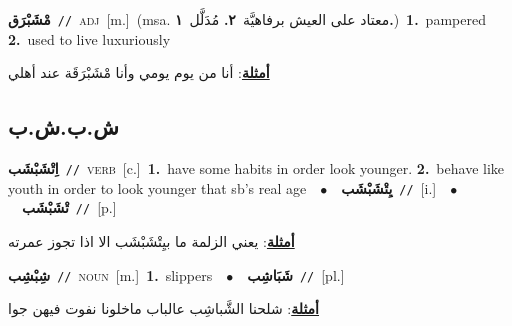 \documentclass[10pt,a4paper,twoside]{article} %
\begin{document}
\begin{multicols}{2}
{{{{{{{{{{\setlength\topsep{0pt}\textbf{\foreignlanguage{arabic}{مْشَبْرَق}}\ {\color{gray}\texttt{//}\color{black}}\ \textsc{adj}\ [m.]\ \color{gray}(msa. \foreignlanguage{arabic}{معتاد على العيش برفاهيَّة}~\foreignlanguage{arabic}{\textbf{٢.}}  \foreignlanguage{arabic}{مُدَلَّل}~\foreignlanguage{arabic}{\textbf{١.}})\color{black}\ \textbf{1.}~pampered  \textbf{2.}~used to live luxuriously\  \begin{flushright}\color{gray}\foreignlanguage{arabic}{\textbf{\underline{\foreignlanguage{arabic}{أمثلة}}}: أنا من يوم يومي وأنا مْشَبْرَقَة عند أهلي}\end{flushright}\color{black}} \vspace{2mm}

\vspace{-3mm}
\subsection*{\color{blue}\foreignlanguage{arabic}{ش.ب.ش.ب}\color{blue}{}} 

{\setlength\topsep{0pt}\textbf{\foreignlanguage{arabic}{اِتْشَبْشَب}}\ {\color{gray}\texttt{//}\color{black}}\ \textsc{verb}\ [c.]\ \textbf{1.}~have some habits in order look younger.  \textbf{2.}~behave like youth in order to look younger that sb's real age\ \ $\bullet$\ \ \setlength\topsep{0pt}\textbf{\foreignlanguage{arabic}{يِتْشَبْشَب}}\ {\color{gray}\texttt{//}\color{black}}\ [i.]\ \ $\bullet$\ \ \setlength\topsep{0pt}\textbf{\foreignlanguage{arabic}{تْشَبْشَب}}\ {\color{gray}\texttt{//}\color{black}}\ [p.]\  \begin{flushright}\color{gray}\foreignlanguage{arabic}{\textbf{\underline{\foreignlanguage{arabic}{أمثلة}}}: يعني الزلمة ما بيِتْشَبْشَب الا اذا تجوز عمرته}\end{flushright}\color{black}} \vspace{2mm}

{\setlength\topsep{0pt}\textbf{\foreignlanguage{arabic}{شِبْشِب}}\ {\color{gray}\texttt{//}\color{black}}\ \textsc{noun}\ [m.]\ \textbf{1.}~slippers\ \ $\bullet$\ \ \setlength\topsep{0pt}\textbf{\foreignlanguage{arabic}{شَبَاشِب}}\ {\color{gray}\texttt{//}\color{black}}\ [pl.]\  \begin{flushright}\color{gray}\foreignlanguage{arabic}{\textbf{\underline{\foreignlanguage{arabic}{أمثلة}}}: شلحنا الشَّباشِب عالباب ماخلونا نفوت فيهن جوا}\end{flushright}\color{black}} \vspace{2mm}

}}}}}}}}}
\end{multicols}
\end{document}

